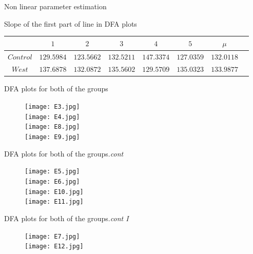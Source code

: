 \documentclass[t,12pt,english
\ifx\beamermode\undefined\else,\beamermode\fi
]{beamer}
\begin{document}
\begin{frame}{Non linear parameter estimation}
\begin{table}[!htbp]
\tiny
\centering
\tiny Slope of the first part of line in DFA plots
\begin{tabular}{ c c c c c c c c} 
\hline
&$1$&$2$&$3$&$4$&$5$&$\mu$\\
\hline
$Control$&$129.5984$&$123.5662$&$132.5211$&$147.3374$&$127.0359$&$132.0118$\\
$West$&$137.6878$&$132.0872$&$135.5602$&$129.5709$&$135.0323$&$133.9877$\\
\hline 
\end{tabular}
\end{table}

   
\end{frame}    



\begin{frame}{DFA plots for both of the groups}

\begin{figure}[!htbp]
%
\centering
\texttt{[image: E3.jpg]}\\
\texttt{[image: E4.jpg]}\\
\endminipage\hfill
{}%
\centering
\texttt{[image: E8.jpg]}\\
\texttt{[image: E9.jpg]}\\
\endminipage\hfill
\end{figure}

    
\end{frame}

\begin{frame}{DFA plots for both of the groups.\textit{cont}}

\begin{figure}[!htbp]
%
\centering
\texttt{[image: E5.jpg]}\\
\texttt{[image: E6.jpg]}\\
\endminipage\hfill
{}%
\centering
\texttt{[image: E10.jpg]}\\
\texttt{[image: E11.jpg]}\\
\endminipage\hfill
\end{figure}

    
\end{frame}

\begin{frame}{DFA plots for both of the groups.\textit{cont I}}

\begin{figure}[!htbp]
%
\centering
\texttt{[image: E7.jpg]}\\
\endminipage\hfill
{}%
\centering
\texttt{[image: E12.jpg]}\\
\endminipage\hfill
\end{figure}

    
\end{frame}
\end{document}
